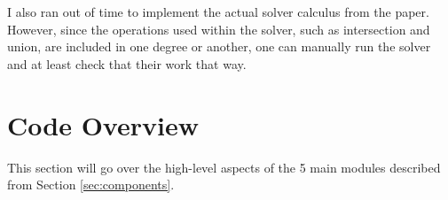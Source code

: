 \documentclass[letterpaper, 11pt]{article}
\begin{document}
I also ran out of time to implement the actual solver calculus from the paper.
However, since the operations used within the solver, such as intersection and union, are included in one degree or another, one can manually run the solver and at least check that their work that way.

\section{Code Overview}\label{sec:code}
This section will go over the high-level aspects of the 5 main modules described from Section \ref*{sec:components}.
\end{document}

